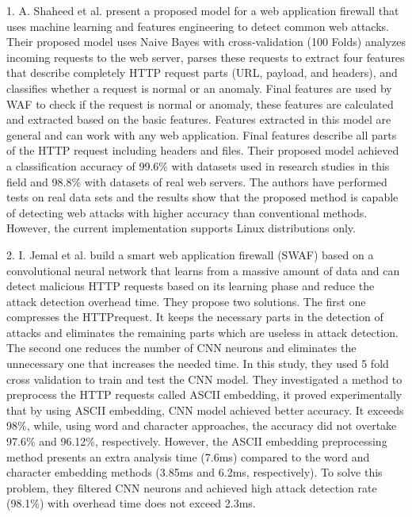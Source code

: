 1.	A. Shaheed et al. \cite{Shaheed} present a proposed model for a web application firewall that uses machine learning and features engineering to detect common web attacks. Their proposed model uses Naive Bayes with cross-validation (100 Folds) analyzes incoming requests to the web server, parses these requests to extract four features that describe completely HTTP request parts (URL, payload, and headers), and classifies whether a request is normal or an anomaly. Final features are used by WAF to check if the request is normal or anomaly, these features are calculated and extracted based on the basic features. Features extracted in this model are general and can work with any web application. Final features describe all parts of the HTTP request including headers and files. Their proposed model achieved a classification accuracy of 99.6\% with datasets used in research studies in this field and 98.8\% with datasets of real web servers. The authors have performed tests on real data sets and the results show that the proposed method is capable of detecting web attacks with higher accuracy than conventional methods. However, the current implementation supports Linux distributions only. 

2.	I. Jemal et al. \cite{Jemal} build a smart web application ﬁrewall (SWAF) based on a convolutional neural network that learns from a massive amount of data and can detect malicious HTTP requests based on its learning phase and reduce the attack detection overhead time. They propose two solutions. The ﬁrst one compresses the HTTPrequest. It keeps the necessary parts in the detection of attacks and eliminates the remaining parts which are useless in attack detection. The second one reduces the number of CNN neurons and eliminates the unnecessary one that increases the needed time. In this study, they used 5 fold cross validation to train and test the CNN model. They investigated a method to preprocess the HTTP requests called ASCII embedding, it proved experimentally that by using ASCII embedding, CNN model achieved better accuracy. It exceeds 98\%, while, using word and character approaches, the accuracy did not overtake 97.6\% and 96.12\%, respectively. However, the ASCII embedding preprocessing method presents an extra analysis time (7.6ms) compared to the word and character embedding methods (3.85ms and 6.2ms, respectively). To solve this problem, they filtered CNN neurons and achieved high attack detection rate (98.1\%) with overhead time does not exceed 2.3ms.

